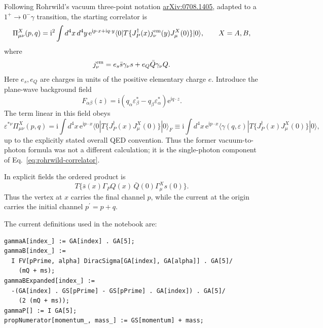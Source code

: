 \documentclass[11pt]{article}
\newcommand{\ii}{\mathrm{i}}
\newcommand{\ee}{\mathrm{e}}
\begin{document}
Following Rohrwild's vacuum three-point notation
\href{https://arxiv.org/abs/0708.1405}{arXiv:0708.1405}, adapted to a
$1^+\to0^-\gamma$ transition, the starting correlator is
\begin{equation}
  \Pi^X_{\mu\nu}(p,q)=\ii^2\int d^4x\,d^4y\,
  \ee^{\ii p\cdot x+\ii q\cdot y}
  \langle0|T\{J_P^\dagger(x)j_\nu^{\rm em}(y)J^X_\mu(0)\}|0\rangle,
  \qquad X=A,B,
  \label{eq:rohrwild-correlator}
\end{equation}
where
\begin{equation}
  j_\nu^{\rm em}=e_s\bar s\gamma_\nu s+e_Q\bar Q\gamma_\nu Q.
\end{equation}
Here $e_s,e_Q$ are charges in units of the positive elementary charge $e$.
Introduce the plane-wave background field
\begin{equation}
  F_{\alpha\beta}(z)=\ii
  (q_\alpha\varepsilon^*_\beta-q_\beta\varepsilon^*_\alpha)
  \ee^{\ii q\cdot z}.
\end{equation}
The term linear in this field obeys
\begin{equation}
  \varepsilon^{*\nu}\Pi^X_{\mu\nu}(p,q)
  =\ii\int d^4x\,\ee^{\ii p\cdot x}
  \langle0|T\{J_P^\dagger(x)J^X_\mu(0)\}|0\rangle_F
  \equiv
  \ii\int d^4x\,\ee^{\ii p\cdot x}
  \langle\gamma(q,\varepsilon)|T\{J_P^\dagger(x)J^X_\mu(0)\}|0\rangle,
  \label{eq:background-external-equivalence}
\end{equation}
up to the explicitly stated overall QED convention.  Thus the former
vacuum-to-photon formula was not a different calculation; it is the
single-photon component of Eq.~\eqref{eq:rohrwild-correlator}.

In explicit fields the ordered product is
\begin{equation}
  T\{\bar s(x)\Gamma_PQ(x)\,\bar Q(0)\Gamma^X_\mu s(0)\}.
  \label{eq:field-order}
\end{equation}
Thus the vertex at $x$ carries the final channel $p$, while the current at the
origin carries the initial channel $p^{\prime}=p+q$.

The current definitions used in the notebook are:
\begin{lstlisting}
gammaA[index_] := GA[index] . GA[5];
gammaB[index_] :=
  I FV[pPrime, alpha] DiracSigma[GA[index], GA[alpha]] . GA[5]/
    (mQ + ms);
gammaBExpanded[index_] :=
  -(GA[index] . GS[pPrime] - GS[pPrime] . GA[index]) . GA[5]/
    (2 (mQ + ms));
gammaP[] := I GA[5];
propNumerator[momentum_, mass_] := GS[momentum] + mass;
\end{lstlisting}
\end{document}
